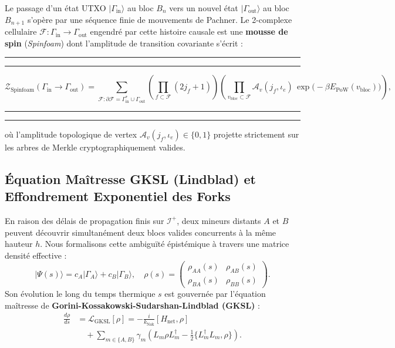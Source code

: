\documentclass[10pt,twocolumn,a4paper]{article}
\newenvironment{widetext}{%
  \begin{strip}
  \rule{\dimexpr(0.5\textwidth-0.5\columnsep-0.4pt)}{0.4pt}%
  \rule{0.4pt}{6pt}\par\vspace{-2pt}%
}{%
  \par\vspace{-2pt}\hfill%
  \rule[-6pt]{0.4pt}{6.4pt}%
  \rule{\dimexpr(0.5\textwidth-0.5\columnsep-0.4pt)}{0.4pt}%
  \end{strip}
}
\theoremstyle{plain}
\theoremstyle{definition}
\theoremstyle{remark}
\newcommand{\kNak}{k_{\text{Nak}}}
\newcommand{\scri}{\mathcal{I}}
\begin{document}
Le passage d'un état UTXO $|\Gamma_{\text{in}}\rangle$ au bloc $B_n$ vers un nouvel état $|\Gamma_{\text{out}}\rangle$ au bloc $B_{n+1}$ s'opère par une séquence finie de mouvements de Pachner. Le 2-complexe cellulaire $\mathcal{F} : \Gamma_{\text{in}} \to \Gamma_{\text{out}}$ engendré par cette histoire causale est une \textbf{mousse de spin} (\textit{Spinfoam}) dont l'amplitude de transition covariante s'écrit :

\begin{widetext}
\begin{equation}
    \mathcal{Z}_{\text{Spinfoam}}(\Gamma_{\text{in}} \to \Gamma_{\text{out}}) = \sum_{\mathcal{F} : \partial\mathcal{F} = \Gamma_{\text{in}}^* \cup \Gamma_{\text{out}}} \left( \prod_{f \subset \mathcal{F}} (2 j_f + 1) \right) \left( \prod_{v_{\text{bloc}} \subset \mathcal{F}} \mathcal{A}_v(j_f, \iota_e) \, \exp\big(-\beta E_{\text{PoW}}(v_{\text{bloc}})\big) \right),
    \label{eq:SpinfoamAmplitude}
\end{equation}
\end{widetext}
où l'amplitude topologique de vertex $\mathcal{A}_v(j_f, \iota_e) \in \{0, 1\}$ projette strictement sur les arbres de Merkle cryptographiquement valides.

\subsection{Équation Maîtresse GKSL (Lindblad) et Effondrement Exponentiel des Forks}

En raison des délais de propagation finis sur $\scri^+$, deux mineurs distants $A$ et $B$ peuvent découvrir simultanément deux blocs valides concurrents à la même hauteur $h$. Nous formalisons cette ambiguïté épistémique à travers une matrice densité effective :
\begin{equation}
    |\Psi(s)\rangle = c_A |\Gamma_A\rangle + c_B |\Gamma_B\rangle, \quad \rho(s) = \begin{pmatrix} \rho_{AA}(s) & \rho_{AB}(s) \\ \rho_{BA}(s) & \rho_{BB}(s) \end{pmatrix}.
    \label{eq:ForkSuperposition}
\end{equation}
Son évolution le long du temps thermique $s$ est gouvernée par l'équation maîtresse de \textbf{Gorini-Kossakowski-Sudarshan-Lindblad (GKSL)} \cite{Lindblad1976,GKS1976} :
\begin{equation}
\begin{split}
    \frac{d\rho}{ds} &= \mathcal{L}_{\text{GKSL}}[\rho] = -\frac{i}{\kNak} [H_{\text{net}}, \rho] \\
    &\quad + \sum_{m \in \{A, B\}} \gamma_m \left( L_m \rho L_m^\dagger - \frac{1}{2} \big\{ L_m^\dagger L_m, \rho \big\} \right).
\end{split}
\label{eq:GKSLEquation}
\end{equation}
\end{document}
